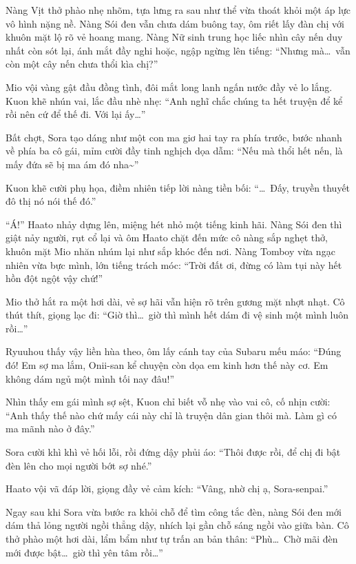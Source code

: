 \documentclass[../main.tex]{subfiles}
\begin{document}
Nàng Vịt thở phào nhẹ nhõm, tựa lưng ra sau như thể vừa thoát khỏi một áp lực vô hình nặng nề. Nàng Sói đen vẫn chưa dám buông tay, ôm riết lấy đàn chị với khuôn mặt lộ rõ vẻ hoang mang. Nàng Nữ sinh trung học liếc nhìn cây nến duy nhất còn sót lại, ánh mắt đầy nghi hoặc, ngập ngừng lên tiếng: ``Nhưng mà\dots\ vẫn còn một cây nến chưa thổi kìa chị?''

Mio vội vàng gật đầu đồng tình, đôi mắt long lanh ngấn nước đầy vẻ lo lắng. Kuon khẽ nhún vai, lắc đầu nhè nhẹ: ``Anh nghĩ chắc chúng ta hết truyện để kể rồi nên cứ để thế đi. Với lại ấy\dots''


Bất chợt, Sora tạo dáng như một con ma giơ hai tay ra phía trước, bước nhanh về phía ba cô gái, mỉm cười đầy tinh nghịch dọa dẫm: ``Nếu mà thổi hết nến, là mấy đứa sẽ bị ma ám đó nha\~{}''

Kuon khẽ cười phụ họa, điềm nhiên tiếp lời nàng tiền bối: ``\dots\ Đấy, truyền thuyết đô thị nó nói thế đó.''

``Á!'' Haato nhảy dựng lên, miệng hét nhỏ một tiếng kinh hãi. Nàng Sói đen thì giật nảy người, rụt cổ lại và ôm Haato chặt đến mức cô nàng sắp nghẹt thở, khuôn mặt Mio nhăn nhúm lại như sắp khóc đến nơi. Nàng Tomboy vừa ngạc nhiên vừa bực mình, lớn tiếng trách móc: ``Trời đất ơi, đừng có làm tụi này hết hồn đột ngột vậy chứ!''

Mio thở hắt ra một hơi dài, vẻ sợ hãi vẫn hiện rõ trên gương mặt nhợt nhạt. Cô thút thít, giọng lạc đi: ``Giờ thì\dots\ giờ thì mình hết dám đi vệ sinh một mình luôn rồi\dots''

Ryuuhou thấy vậy liền hùa theo, ôm lấy cánh tay của Subaru mếu máo: ``Đúng đó! Em sợ ma lắm, Onii-san kể chuyện còn dọa em kinh hơn thế này cơ. Em không dám ngủ một mình tối nay đâu!''

Nhìn thấy em gái mình sợ sệt, Kuon chỉ biết vỗ nhẹ vào vai cô, cố nhịn cười: ``Anh thấy thế nào chứ mấy cái này chỉ là truyện dân gian thôi mà. Làm gì có ma mãnh nào ở đây.''

Sora cười khì khì vẻ hối lỗi, rồi đứng dậy phủi áo: ``Thôi được rồi, để chị đi bật đèn lên cho mọi người bớt sợ nhé.''

Haato vội vã đáp lời, giọng đầy vẻ cảm kích: ``Vâng, nhờ chị ạ, Sora-senpai.''

Ngay sau khi Sora vừa bước ra khỏi chỗ để tìm công tắc đèn, nàng Sói đen mới dám thả lỏng người ngồi thẳng dậy, nhích lại gần chỗ sáng ngồi vào giữa bàn. Cô thở phào một hơi dài, lẩm bẩm như tự trấn an bản thân: ``Phù\dots\ Chờ mãi đèn mới được bật\dots\ giờ thì yên tâm rồi\dots''
\end{document}
